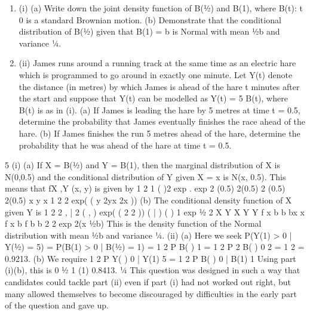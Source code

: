 \documentclass[a4paper,12pt]{article}
\begin{document}
\begin{enumerate}

\item (i) (a) Write down the joint density function of B(½) and B(1), where
{B(t): t 0} is a standard Brownian motion.
(b) Demonstrate that the conditional distribution of B(½) given that
B(1) = b is Normal with mean ½b and variance ¼.

\item 
(ii) James runs around a running track at the same time as an electric hare which
is programmed to go around in exactly one minute. Let Y(t) denote the
distance (in metres) by which James is ahead of the hare t minutes after the
start and suppose that Y(t) can be modelled as Y(t) = 5 B(t), where B(t) is as
in (i).
(a) If James is leading the hare by 5 metres at time t = 0.5, determine the
probability that James eventually finishes the race ahead of the hare.
(b) If James finishes the run 5 metres ahead of the hare, determine the
probability that he was ahead of the hare at time t = 0.5.
\end{enumerate}
\newpage


5 (i) (a) If X = B(½) and Y = B(1), then the marginal distribution of X is N(0,0.5)
and the conditional distribution of Y given X = x is N(x, 0.5).
This means that fX ,Y (x, y) is given by
1 2 1 ( )2
exp . exp
2 (0.5) 2(0.5) 2 (0.5) 2(0.5)
x y x
1 2 2
exp( ( y 2yx 2x ))
(b) The conditional density function of X given Y is
1 2 2
,
|
2
( , ) exp( ( 2 2 ))
( | )
( ) 1 exp ½
2
X Y
X Y
Y
f x b b bx x
f x b
f b b
2 2
exp 2(x ½b)
This is the density function of the Normal distribution with mean ½b
and variance ¼.
(ii) (a) Here we seek P(Y(1) > 0 | Y(½) = 5) = P(B(1) > 0 | B(½) = 1)
= 1
2 P B( ) 1
= 1
2 P 2 B( ) 0 2
= 1 2 = 0.9213.
(b) We require 1
2 P Y( ) 0 | Y(1) 5 = 1
2 P B( ) 0 | B(1) 1
Using part (i)(b), this is
0 ½
1 (1) 0.8413.
¼
This question was designed in such a way that candidates could tackle part (ii) even if part (i)
had not worked out right, but many allowed themselves to become discouraged by difficulties
in the early part of the question and gave up.
\end{document}

